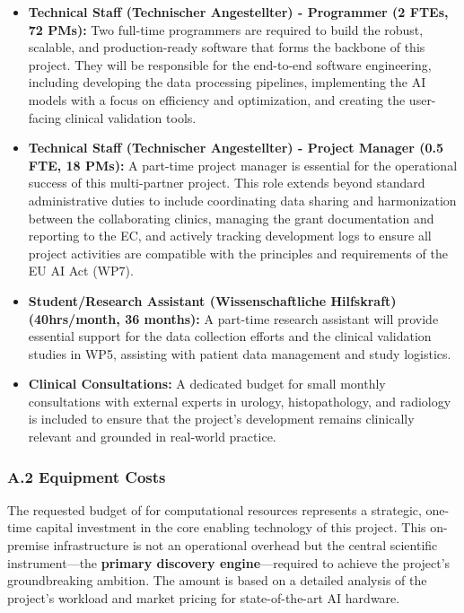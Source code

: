 \begin{itemize}
    \item \textbf{Technical Staff (Technischer Angestellter) - Programmer (2 FTEs, 72 PMs):} Two full-time programmers are required to build the robust, scalable, and production-ready software that forms the backbone of this project. They will be responsible for the end-to-end software engineering, including developing the data processing pipelines, implementing the AI models with a focus on efficiency and optimization, and creating the user-facing clinical validation tools.
    \item \textbf{Technical Staff (Technischer Angestellter) - Project Manager (0.5 FTE, 18 PMs):} A part-time project manager is essential for the operational success of this multi-partner project. This role extends beyond standard administrative duties to include coordinating data sharing and harmonization between the collaborating clinics, managing the grant documentation and reporting to the EC, and actively tracking development logs to ensure all project activities are compatible with the principles and requirements of the EU AI Act (WP7).
    \item \textbf{Student/Research Assistant (Wissenschaftliche Hilfskraft) (40hrs/month, 36 months):} A part-time research assistant will provide essential support for the data collection efforts and the clinical validation studies in WP5, assisting with patient data management and study logistics.
    \item \textbf{Clinical Consultations:} A dedicated budget for small monthly consultations with external experts in urology, histopathology, and radiology is included to ensure that the project's development remains clinically relevant and grounded in real-world practice.
\end{itemize}

\subsubsection*{A.2 Equipment Costs}
The requested budget of  for computational resources represents a strategic, one-time capital investment in the core enabling technology of this project. This on-premise infrastructure is not an operational overhead but the central scientific instrument—the \textbf{primary discovery engine}—required to achieve the project's groundbreaking ambition. The amount is based on a detailed analysis of the project's workload and market pricing for state-of-the-art AI hardware.

